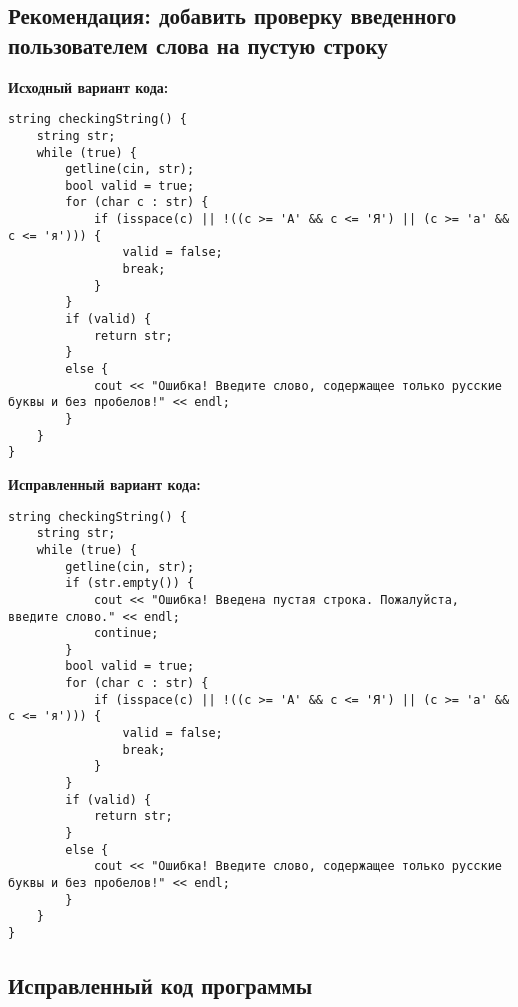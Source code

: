 \documentclass[11pt,a4paper,final]{article} %
\begin{document}
\subsection{Рекомендация: добавить проверку введенного пользователем слова на пустую строку}

\begin{minipage}[t]{0.48\textwidth}
\textbf{Исходный вариант кода:}
\begin{lstlisting}
string checkingString() {
	string str;
	while (true) {
		getline(cin, str);
		bool valid = true;
		for (char c : str) {
			if (isspace(c) || !((c >= 'А' && c <= 'Я') || (c >= 'а' && c <= 'я'))) {
				valid = false;
				break;
			}
		}
		if (valid) {
			return str;
		}
		else {
			cout << "Ошибка! Введите слово, содержащее только русские буквы и без пробелов!" << endl;
		}
	}
}
\end{lstlisting}
\end{minipage}
\hfill %
\begin{minipage}[t]{0.48\textwidth}
\textbf{Исправленный вариант кода:}
\begin{lstlisting}
string checkingString() {
	string str;
	while (true) {
		getline(cin, str);		
		if (str.empty()) {
			cout << "Ошибка! Введена пустая строка. Пожалуйста, введите слово." << endl;
			continue; 
		}	
		bool valid = true;
		for (char c : str) {
			if (isspace(c) || !((c >= 'А' && c <= 'Я') || (c >= 'а' && c <= 'я'))) {
				valid = false;
				break;
			}
		}	
		if (valid) {
			return str;
		}
		else {
			cout << "Ошибка! Введите слово, содержащее только русские буквы и без пробелов!" << endl;
		}
	}
}
\end{lstlisting}
\end{minipage}

\newpage
\subsection{Исправленный код программы}
\end{document}
